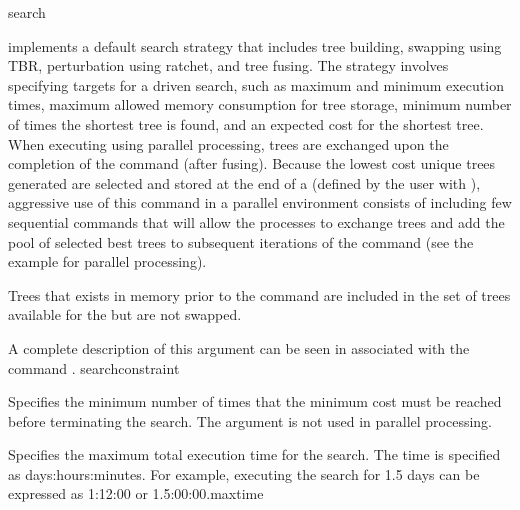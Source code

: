 
\begin{command}{search}{}


    \begin{poydescription}
         implements a default search strategy that
        includes tree building, swapping using TBR, perturbation using
        ratchet, and tree fusing. The strategy involves specifying targets for 
        a driven search, such as maximum and minimum execution times, 
        maximum allowed memory consumption for tree storage, minimum number of times the
        shortest tree is found, and an expected cost for the shortest tree.  When executing
         using parallel processing, trees are exchanged upon the
        completion of the command (after fusing).  Because the lowest cost unique trees 
        generated are selected and stored at the end of a  
        (defined by the user with ), aggressive use of this 
        command in a parallel environment consists of including few sequential
         commands that will allow the processes to
        exchange trees and add the pool of selected best trees to subsequent
        iterations of the command (see the example for parallel processing).

        Trees that exists in memory prior to the  command
        are included in the set of trees available for the  but are not swapped.
    \end{poydescription}

    \begin{arguments}

            {A complete description of this argument can be seen in
             associated with the command
            .}
            {searchconstraint}

            {Specifies the minimum number of times that the minimum cost must be
            reached before terminating the search.  The 
            argument is not used in parallel processing.}
            {} 
        
            {Specifies the maximum total execution time for the search. The time is specified as
            days:hours:minutes. For example, executing the search for 1.5 days can
            be expressed as 1:12:00 or 1.5:00:00.}{maxtime}
        

\end{arguments}
\end{command}
